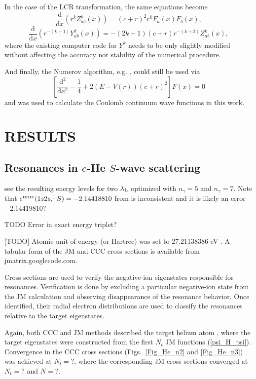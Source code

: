 \documentclass[aip
, pra
, showpacs
, aps
, twocolumn
, groupedaddress
, floatfix
]{revtex4}
\newcommand{\beq}{\begin{equation}}
\newcommand{\eeq}{\end{equation}}
\newcommand{\dd}{\mbox{d}}
\begin{document}
In the case of the LCR transformation, the same equations become
\beq
\frac{\dd}{\dd x} \left( r^k Z^k_{ab}(x) \right) = (c+r)^2r^k F_a(x) F_{b}(x), \label{Z_k_eq_LCR} \eeq
\beq
\frac{\dd}{\dd x} \left( r^{-(k+1)} Y^k_{ab}(x) \right) = -(2k+1)(c+r)r^{-(k+2)} Z^k_{ab}(x),
\label{Y_k_eq_LCR}
\eeq
where the existing computer code for $Y^k$ \cite{FF87} needs to be only slightly modified without affecting the accuracy nor stability of the numerical procedure.

And finally, the Numerov algorithm, e.g. \cite{JS02}, could still be used  via
\beq
\left[ \frac{\dd^2}{\dd x^2} - \frac{1}{4} + 2(E-V(r)) (c+r)^2 \right] F(x) = 0
\eeq
and was used to calculate the Coulomb continuum wave functions in this work.





\section{RESULTS}

\subsection{Resonances in $e$-He $S$-wave scattering}

see the resulting energy levels for two $\lambda_{\rm L}$ optimized with $n_\gamma=5$ and $n_\gamma=7$.
Note that $e^{\mbox{\tiny{DHIF}}}(1s2s,^1S)=-2.14418810$ from \cite{DHIF94} is inconsistent
and it is likely an error $-2.14419810$?


TODO Error in exact energy triplet?

[TODO]
Atomic unit of energy (or Hartree) was set to 27.21138386 eV \cite{MTN08}. A tabular
form of the JM and CCC cross sections is available from jmatrix.googlecode.com.


Cross sections are used to verify the negative-ion eigenstates responsible for resonances.
Verification is done by excluding a particular negative-ion state from the JM calculation and observing disappearance of the resonance behavior.
Once identified, their radial electron distributions are used to classify the resonances relative to the target eigenstates.






Again, both CCC and JM methods described the target helium atom
, where the target eigenstates were constructed from the first $N_t$ JM functions (\ref{psi_H_psi}). Convergence in the CCC cross sections
(Figs.~\ref{Fig_He_n2} and \ref{Fig_He_n3}) was achieved at $N_t=?$, where the corresponding JM cross sections
converged at $N_t=?$ and $N=?$.
\end{document}
